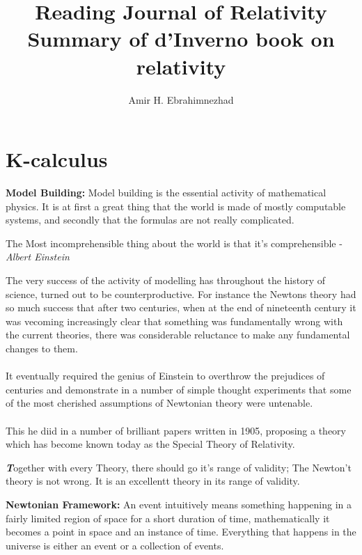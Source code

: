 \documentclass[10pt,a4paper,twocolumn]{article}
\title{Reading Journal of Relativity \\ \large Summary of d'Inverno book on relativity}
\author{Amir H. Ebrahimnezhad}
\date{}
\newcounter{theo}
\newenvironment{callout}
	{\begin{calloutbox}\color{charcoal}\textbf\textit}
	{\end{calloutbox}}
\begin{document}
            \maketitle
            \tableofcontents
            \section{K-calculus}
                \textbf{Model Building:} Model building is the essential activity of mathematical physics. It is at first a great thing that the world is made of mostly computable systems, and secondly that the formulas are not really complicated.
                \begin{qt}
                        The Most incomprehensible thing about the world is that it's comprehensible - \textit{Albert Einstein}
                \end{qt}
                \indent The very success of the activity of modelling has throughout the history of science, turned out to be counterproductive. For instance the Newtons theory had so much success that after two centuries, when at the end of nineteenth century it was vecoming increasingly clear that something was fundamentally wrong with the current theories, there was considerable reluctance to make any fundamental changes to them.
                \\
                \\
                \indent It eventually required the genius of Einstein to overthrow the prejudices of centuries and demonstrate in a number of simple thought experiments that some of the most cherished assumptions of Newtonian theory were untenable.
                \\
                \\
                \indent This he diid in a number of brilliant papers written in 1905, proposing a theory which has become known today as the Special Theory of Relativity.
                \begin{callout}
                        Together with every Theory, there should go it's range of validity; The Newton't theory is not wrong. It is an excellentt theory in its range of validity.
                \end{callout}
                \textbf{Newtonian Framework: } An event intuitively means something happening in a fairly limited region of space for a short duration of time, mathematically it becomes a point in space and an instance of time. Everything that happens in the universe is either an event or a collection of events.
\end{document}
